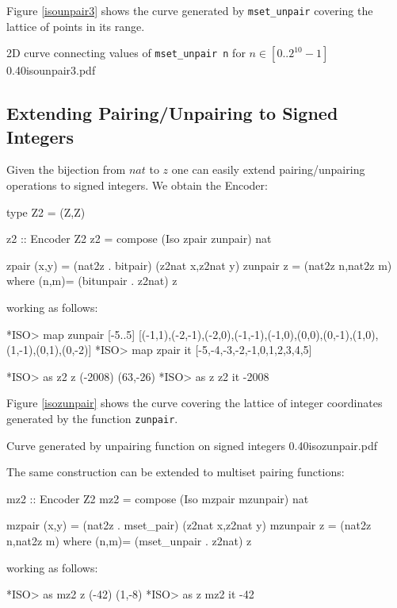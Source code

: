\documentclass[]{INCLUDES/llncs}
\begin{document}
Figure \ref{isounpair3} shows the curve generated by {\tt mset\_unpair}
covering the lattice of points in its range.

{2D curve connecting values of {\tt mset\_unpair n} for $n \in [0..2^{10}-1]$}
{0.40}{isounpair3.pdf}

\subsection{Extending Pairing/Unpairing to Signed Integers}
Given the bijection from $nat$ to $z$ one can easily extend pairing/unpairing
operations to signed integers. We obtain the Encoder:
\begin{code}
type Z2 = (Z,Z)

z2 :: Encoder Z2
z2 = compose (Iso zpair zunpair) nat

zpair (x,y) = (nat2z . bitpair) (z2nat x,z2nat y)
zunpair z = (nat2z n,nat2z m) where (n,m)= (bitunpair . z2nat) z
\end{code}
working as follows:
\begin{codex}
*ISO> map zunpair [-5..5]
[(-1,1),(-2,-1),(-2,0),(-1,-1),(-1,0),(0,0),(0,-1),(1,0),(1,-1),(0,1),(0,-2)]
*ISO> map zpair it
[-5,-4,-3,-2,-1,0,1,2,3,4,5]

*ISO> as z2 z (-2008)
(63,-26)
*ISO> as z z2 it
-2008
\end{codex}
Figure \ref{isozunpair} shows the curve covering the lattice of integer
coordinates generated by the function {\tt zunpair}.

{Curve generated by unpairing function on signed integers}
{0.40}{isozunpair.pdf}

The same construction can be extended to multiset pairing functions:
\begin{code}
mz2 :: Encoder Z2
mz2 = compose (Iso mzpair mzunpair) nat

mzpair (x,y) = (nat2z . mset_pair) (z2nat x,z2nat y)
mzunpair z = (nat2z n,nat2z m) where (n,m)= (mset_unpair . z2nat) z
\end{code}
working as follows:
\begin{codex}
*ISO> as mz2 z (-42)
(1,-8)
*ISO> as z mz2 it
-42
\end{codex}
\end{document}
